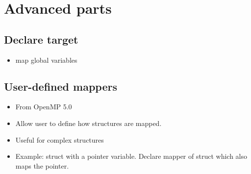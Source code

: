 \section{Advanced parts}
\subsection{Declare target}
\label{ssec:declare_target}
\begin{itemize}
  \item map global variables
\end{itemize}


\subsection{User-defined mappers}
\label{sec:mapper}
\begin{itemize}
  \item From OpenMP 5.0
  \item Allow user to define how structures are mapped.
  \item Useful for complex structures
  \item Example: struct with a pointer variable. Declare mapper of struct which also maps the pointer.
\end{itemize}


